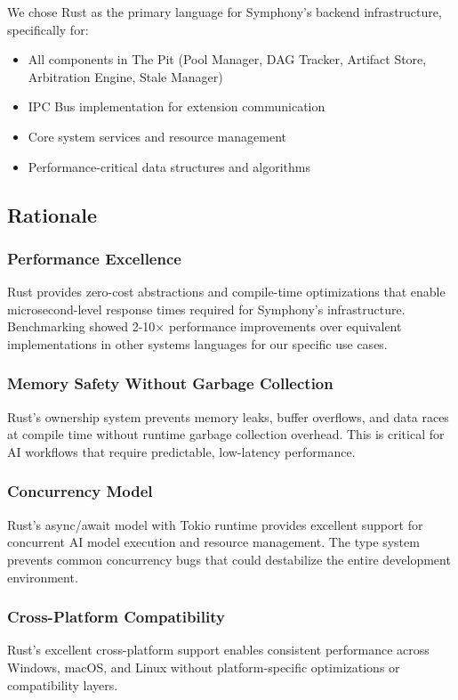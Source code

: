 We chose Rust as the primary language for Symphony's backend infrastructure, specifically for:

\begin{itemize}
\item All components in The Pit (Pool Manager, DAG Tracker, Artifact Store, Arbitration Engine, Stale Manager)
\item IPC Bus implementation for extension communication
\item Core system services and resource management
\item Performance-critical data structures and algorithms
\end{itemize}

\subsection*{Rationale}

\subsubsection*{Performance Excellence}
Rust provides zero-cost abstractions and compile-time optimizations that enable microsecond-level response times required for Symphony's infrastructure. Benchmarking showed 2-10× performance improvements over equivalent implementations in other systems languages for our specific use cases.

\subsubsection*{Memory Safety Without Garbage Collection}
Rust's ownership system prevents memory leaks, buffer overflows, and data races at compile time without runtime garbage collection overhead. This is critical for AI workflows that require predictable, low-latency performance.

\subsubsection*{Concurrency Model}
Rust's async/await model with Tokio runtime provides excellent support for concurrent AI model execution and resource management. The type system prevents common concurrency bugs that could destabilize the entire development environment.

\subsubsection*{Cross-Platform Compatibility}
Rust's excellent cross-platform support enables consistent performance across Windows, macOS, and Linux without platform-specific optimizations or compatibility layers.


